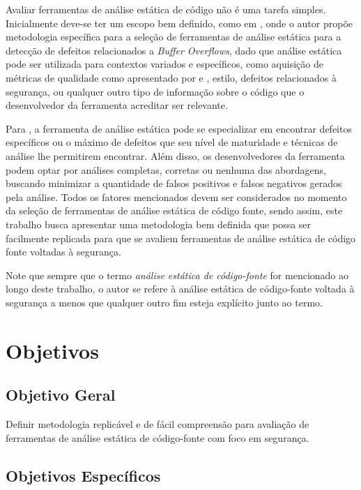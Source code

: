 Avaliar ferramentas de análise estática de código não é uma tarefa simples.
Inicialmente deve-se ter um escopo bem definido, como em \cite{harvard}, onde o autor propõe metodologia específica para a seleção de ferramentas de análise estática para a detecção de defeitos relacionados a \textit{Buffer Overflows}, dado que análise estática pode ser utilizada para contextos variados e específicos, como aquisição de métricas de qualidade como apresentado por \cite{meirelles2013} e \cite{analizoartigo}, estilo, defeitos relacionados à segurança, ou qualquer outro tipo de informação sobre o código que o desenvolvedor da ferramenta acreditar ser relevante.

Para \cite{secure_programming}, a ferramenta de análise estática pode se especializar em encontrar defeitos específicos ou o máximo de defeitos que seu nível de maturidade e técnicas de análise lhe permitirem encontrar. Além disso, os desenvolvedores da ferramenta podem optar por análises completas, corretas ou nenhuma das abordagens, buscando minimizar a quantidade de falsos positivos e falsos negativos gerados pela análise. Todos os fatores mencionados devem ser considerados no momento da seleção de ferramentas de análise estática de código fonte, sendo assim, este trabalho busca apresentar uma metodologia bem definida que possa ser facilmente replicada para que se avaliem ferramentas de análise estática de código fonte voltadas à segurança.

Note que sempre que o termo \textit{análise estática de código-fonte} for mencionado ao longo deste trabalho, o autor se refere à análise estática de código-fonte voltada à segurança a menos que qualquer outro fim esteja explícito junto ao termo.

\section{Objetivos}
\subsection{Objetivo Geral}

Definir metodologia replicável e de fácil compreensão para avaliação de ferramentas de análise estática de código-fonte com foco em segurança.

\subsection{Objetivos Específicos}


